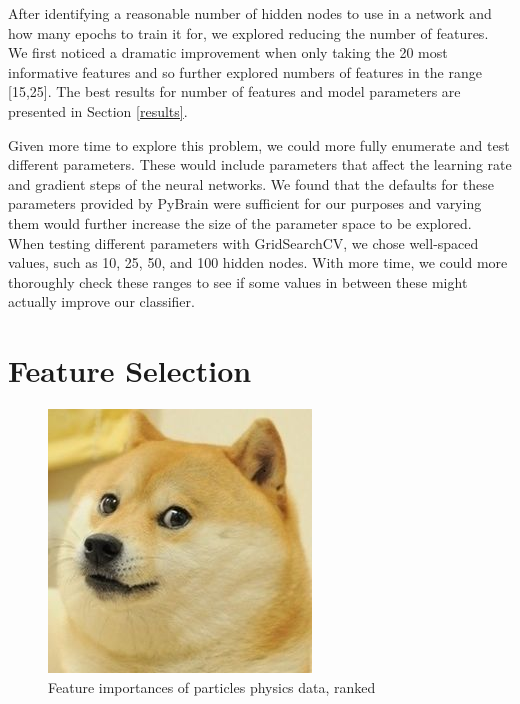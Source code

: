 \documentclass{article}
\begin{document}
After identifying a reasonable number of hidden nodes to use in a network and how many epochs to train it for, we explored reducing the number of features.
We first noticed a dramatic improvement when only taking the 20 most informative features and so further explored numbers of features in the range [15,25].
The best results for number of features and model parameters are presented in Section \ref{results}.

Given more time to explore this problem, we could more fully enumerate and test different parameters.
These would include parameters that affect the learning rate and gradient steps of the neural networks.
We found that the defaults for these parameters provided by PyBrain were sufficient for our purposes and varying them would further increase the size of the parameter space to be explored.
When testing different parameters with GridSearchCV, we chose well-spaced values, such as 10, 25, 50, and 100 hidden nodes.
With more time, we could more thoroughly check these ranges to see if some values in between these might actually improve our classifier.



\section{Feature Selection}

\begin{figure}[!h]
\centering
\includegraphics{placeholder}
\caption{Feature importances of particles physics data, ranked}
\label{fig:placeholder2}
\end{figure}

\end{document}
